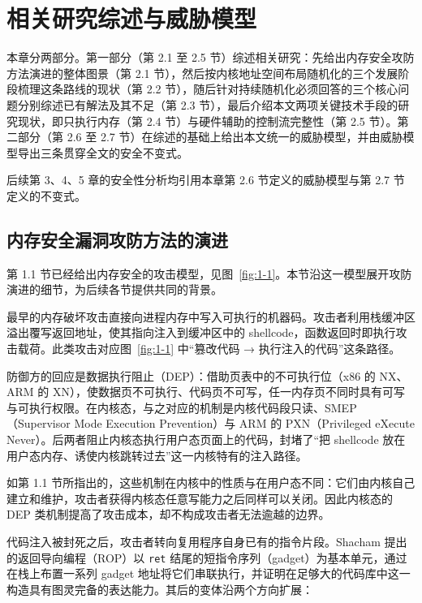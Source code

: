 \chapter{相关研究综述与威胁模型}
\label{chap:2}

本章分两部分。第一部分（第 2.1 至 2.5 节）综述相关研究：先给出内存安全攻防方法演进的整体图景（第 2.1 节），然后按内核地址空间布局随机化的三个发展阶段梳理这条路线的现状（第 2.2 节），随后针对持续随机化必须回答的三个核心问题分别综述已有解法及其不足（第 2.3 节），最后介绍本文两项关键技术手段的研究现状，即只执行内存（第 2.4 节）与硬件辅助的控制流完整性（第 2.5 节）。第二部分（第 2.6 至 2.7 节）在综述的基础上给出本文统一的威胁模型，并由威胁模型导出三条贯穿全文的安全不变式。

后续第 3、4、5 章的安全性分析均引用本章第 2.6 节定义的威胁模型与第 2.7 节定义的不变式。

\section{内存安全漏洞攻防方法的演进}

第 1.1 节已经给出内存安全的攻击模型，见图~\ref{fig:1-1}\citep{szekeres2013sok}。本节沿这一模型展开攻防演进的细节，为后续各节提供共同的背景。

最早的内存破坏攻击直接向进程内存中写入可执行的机器码。攻击者利用栈缓冲区溢出覆写返回地址，使其指向注入到缓冲区中的 shellcode，函数返回时即执行攻击载荷。此类攻击对应图~\ref{fig:1-1} 中“篡改代码 → 执行注入的代码”这条路径。

防御方的回应是数据执行阻止（DEP）\citep{paxteam2003pax}：借助页表中的不可执行位（x86 的 NX、ARM 的 XN），使数据页不可执行、代码页不可写，任一内存页不同时具有可写与可执行权限。在内核态，与之对应的机制是内核代码段只读、SMEP（Supervisor Mode Execution Prevention）与 ARM 的 PXN（Privileged eXecute Never）。后两者阻止内核态执行用户态页面上的代码，封堵了“把 shellcode 放在用户态内存、诱使内核跳转过去”这一内核特有的注入路径。

如第 1.1 节所指出的，这些机制在内核中的性质与在用户态不同：它们由内核自己建立和维护，攻击者获得内核态任意写能力之后同样可以关闭。因此内核态的 DEP 类机制提高了攻击成本，却不构成攻击者无法逾越的边界。

代码注入被封死之后，攻击者转向复用程序自身已有的指令片段。Shacham 提出的返回导向编程（ROP）\citep{shacham2007geometry}以 \lstinline[breaklines=false]@ret@ 结尾的短指令序列（gadget）为基本单元，通过在栈上布置一系列 gadget 地址将它们串联执行，并证明在足够大的代码库中这一构造具有图灵完备的表达能力。其后的变体沿两个方向扩展：

